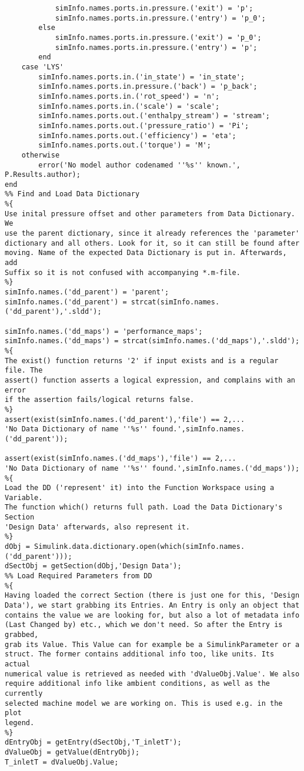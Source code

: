 \begin{lstlisting}
            simInfo.names.ports.in.pressure.('exit') = 'p';
            simInfo.names.ports.in.pressure.('entry') = 'p_0';
        else
            simInfo.names.ports.in.pressure.('exit') = 'p_0';
            simInfo.names.ports.in.pressure.('entry') = 'p';
        end
    case 'LYS'
        simInfo.names.ports.in.('in_state') = 'in_state';
        simInfo.names.ports.in.pressure.('back') = 'p_back';
        simInfo.names.ports.in.('rot_speed') = 'n';
        simInfo.names.ports.in.('scale') = 'scale';
        simInfo.names.ports.out.('enthalpy_stream') = 'stream';
        simInfo.names.ports.out.('pressure_ratio') = 'Pi';
        simInfo.names.ports.out.('efficiency') = 'eta';
        simInfo.names.ports.out.('torque') = 'M';
    otherwise
        error('No model author codenamed ''%s'' known.', P.Results.author);
end
%% Find and Load Data Dictionary
%{
Use inital pressure offset and other parameters from Data Dictionary. We
use the parent dictionary, since it already references the 'parameter'
dictionary and all others. Look for it, so it can still be found after
moving. Name of the expected Data Dictionary is put in. Afterwards, add
Suffix so it is not confused with accompanying *.m-file.
%}
simInfo.names.('dd_parent') = 'parent';
simInfo.names.('dd_parent') = strcat(simInfo.names.('dd_parent'),'.sldd');

simInfo.names.('dd_maps') = 'performance_maps';
simInfo.names.('dd_maps') = strcat(simInfo.names.('dd_maps'),'.sldd');
%{
The exist() function returns '2' if input exists and is a regular file. The
assert() function asserts a logical expression, and complains with an error
if the assertion fails/logical returns false.
%}
assert(exist(simInfo.names.('dd_parent'),'file') == 2,...
'No Data Dictionary of name ''%s'' found.',simInfo.names.('dd_parent'));

assert(exist(simInfo.names.('dd_maps'),'file') == 2,...
'No Data Dictionary of name ''%s'' found.',simInfo.names.('dd_maps'));
%{
Load the DD ('represent' it) into the Function Workspace using a Variable.
The function which() returns full path. Load the Data Dictionary's Section
'Design Data' afterwards, also represent it.
%}
dObj = Simulink.data.dictionary.open(which(simInfo.names.('dd_parent')));
dSectObj = getSection(dObj,'Design Data');
%% Load Required Parameters from DD
%{
Having loaded the correct Section (there is just one for this, 'Design
Data'), we start grabbing its Entries. An Entry is only an object that
contains the value we are looking for, but also a lot of metadata info
(Last Changed by) etc., which we don't need. So after the Entry is grabbed,
grab its Value. This Value can for example be a SimulinkParameter or a
struct. The former contains additional info too, like units. Its actual
numerical value is retrieved as needed with 'dValueObj.Value'. We also
require additional info like ambient conditions, as well as the currently
selected machine model we are working on. This is used e.g. in the plot
legend.
%}
dEntryObj = getEntry(dSectObj,'T_inletT');
dValueObj = getValue(dEntryObj);
T_inletT = dValueObj.Value;


\end{lstlisting}
